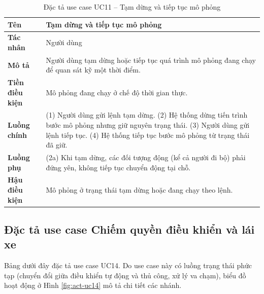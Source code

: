 ﻿\documentclass[../DoAn.tex]{subfiles}
\begin{document}
\begin{table}[H]
	\centering
	\caption{Đặc tả use case UC11 -- Tạm dừng và tiếp tục mô phỏng}
	\begin{tabular}{|p{}|p{}|}
		\hline
		\textbf{Tên} & Tạm dừng và tiếp tục mô phỏng \\ \hline
		\textbf{Tác nhân} & Người dùng \\ \hline
		\textbf{Mô tả} & Người dùng tạm dừng hoặc tiếp tục quá trình mô phỏng đang chạy để quan sát kỹ một thời điểm. \\ \hline
		\textbf{Tiền điều kiện} & Mô phỏng đang chạy ở chế độ thời gian thực. \\ \hline
		\textbf{Luồng chính} & (1) Người dùng gửi lệnh tạm dừng. (2) Hệ thống dừng tiến trình bước mô phỏng nhưng giữ nguyên trạng thái. (3) Người dùng gửi lệnh tiếp tục. (4) Hệ thống tiếp tục bước mô phỏng từ trạng thái đã giữ. \\ \hline
		\textbf{Luồng phụ} & (2a) Khi tạm dừng, các đối tượng động (kể cả người đi bộ) phải đứng yên, không tiếp tục chuyển động tại chỗ. \\ \hline
		\textbf{Hậu điều kiện} & Mô phỏng ở trạng thái tạm dừng hoặc đang chạy theo lệnh. \\
		\hline
	\end{tabular}
\end{table}

\subsection{Đặc tả use case Chiếm quyền điều khiển và lái xe}

Bảng dưới đây đặc tả use case UC14. Do use case này có luồng trạng thái phức tạp
(chuyển đổi giữa điều khiển tự động và thủ công, xử lý va chạm), biểu đồ hoạt
động ở Hình \ref{fig:act-uc14} mô tả chi tiết các nhánh.
\end{document}
